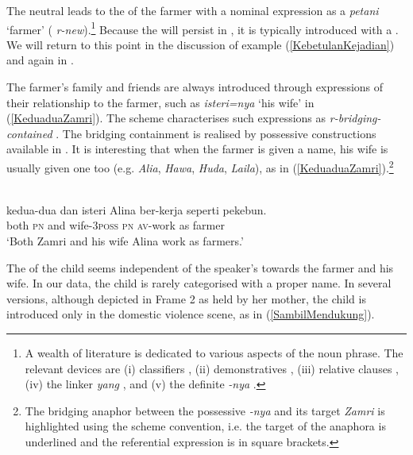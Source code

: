 \documentclass[output=paper
,modfonts
,nonflat]{langsci/langscibook}
\begin{document}
\noindent
The neutral  leads to the  of the farmer with a nominal expression as a \emph{petani} `farmer' ( \emph{r-new}).\footnote{A wealth of literature is dedicated to various aspects of the  noun phrase. The relevant devices are (i) classifiers \citep{Hopper1986, Chung2000, Chung2008, ClearyKemp2007, Chung2010, SalehuddinWinskel2012}, (ii) demonstratives \citep{Himmelmann1996, Williams2009}, (iii) relative clauses \citep{ColeHermon2005}, (iv) the linker \emph{yang} \citep{vanMinde2008}, and (v) the definite \emph{-nya} \citep{Rubin2010}.} Because the  will persist in , it is typically introduced with a  \citep[cf.][317]{Hopper1986}. We will return to this point in the discussion of example (\ref{KebetulanKejadian}) and again in .

The farmer's family and friends are always introduced through expressions of their relationship to the farmer, such as \emph{isteri=nya} `his wife' in (\ref{KeduaduaZamri}). The  scheme characterises such expressions as \emph{r-bridging-contained} \citep[9]{RiesterBaumann2017}. The bridging containment is realised by  possessive constructions available in .  It is interesting that when the farmer is given a name, his wife is usually given one too (e.g. \emph{Alia}, \emph{Hawa}, \emph{Huda}, \emph{Laila}), as in (\ref{KeduaduaZamri}).\footnote{The bridging anaphor between the possessive \emph{-nya} and its target \emph{Zamri} is highlighted using the  scheme convention, i.e.  the target of the anaphora is underlined and the referential expression is in square brackets.}

\ea\label{KeduaduaZamri} 
\\
	\gll kedua-dua        dan  {\ob}isteri     Alina{\cb}       ber-kerja   seperti pekebun.\\
		both      \textsc{pn} and wife-\textsc{3poss} \textsc{pn} \textsc{av}-work  as      farmer\\
\glt `Both Zamri and his wife Alina work as farmers.'
\z

\noindent
The  of the child seems independent of the speaker's  towards the farmer and his wife. In our data, the child is rarely categorised with a proper name. In several versions, although depicted in Frame 2 as held by her mother,  the child is  introduced only in the domestic violence scene, as in (\ref{SambilMendukung}).
\end{document}

